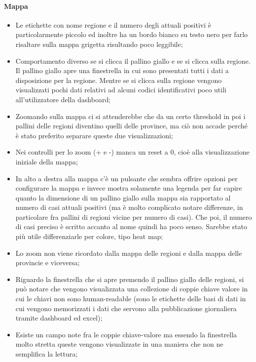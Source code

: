 \paragraph{Mappa}
\begin{itemize}
    \item Le etichette con nome regione e il numero degli attuali positivi è particolarmente piccolo ed inoltre ha un bordo bianco su testo nero per farlo risaltare sulla mappa grigetta risultando poco leggibile;
    \item Comportamento diverso se si clicca il pallino giallo e se si clicca sulla regione. Il pallino giallo apre una finestrella in cui sono presentati tutti i dati a disposizione per la regione. Mentre se si clicca sulla regione vengono visualizzati pochi dati relativi ad alcuni codici identificativi poco utili all'utilizzatore della dashboard;
    \item Zoomando sulla mappa ci si attenderebbe che da un certo threshold in poi i pallini delle regioni diventino quelli delle province, ma ciò non accade perché è stato preferito separare queste due visualizzazioni;
    \item Nei controlli per lo zoom (+ e -) manca un reset a 0, cioè alla visualizzazione iniziale della mappa;
    \item In alto a destra alla mappa c'è un pulsante che sembra offrire opzioni per configurare la mappa e invece mostra solamente una legenda per far capire quanto la dimensione di un pallino giallo sulla mappa sia rapportato al numero di casi attuali positivi (ma è molto complicato notare differenze, in particolare fra pallini di regioni vicine per numero di casi). Che poi, il numero di casi preciso è scritto accanto al nome quindi ha poco senso. Sarebbe stato più utile differenziarle per colore, tipo heat map;
    \item Lo zoom non viene ricordato dalla mappa delle regioni e dalla mappa delle provincie e viceversa;
    \item Riguardo la finestrella che si apre premendo il pallino giallo delle regioni, si può notare che vengono visualizzata una collezione di coppie chiave valore in cui le chiavi non sono human-readable (sono le etichette delle basi di dati in cui vengono memorizzati i dati che servono alla pubblicazione giornaliera tramite dashboard ed excel);
    \item Esiste un campo note fra le coppie chiave-valore ma essendo la finestrella molto stretta queste vengono visualizzate in una maniera che non ne semplifica la lettura;

\end{itemize}
